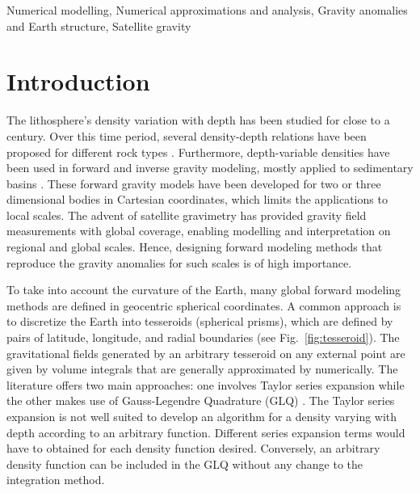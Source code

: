 \documentclass[extra]{gji}
\begin{document}
\begin{keywords}
Numerical modelling, Numerical approximations and analysis, Gravity anomalies
and Earth structure, Satellite gravity
\end{keywords}


\section{Introduction}

The lithosphere's density variation with depth has been studied for close to a
century.
Over this time period,
several density-depth relations have been proposed for different rock types
\citep[e.g.,][]{Maxant1980, Rao1986, Rao1993, Rao1994}.
Furthermore, depth-variable densities have been used in forward and
inverse gravity modeling, mostly applied to sedimentary basins
\citep{Cordell1973, Rao1986, Cowie1990, Rao1993, Rao1994, Zhang2001,
Welford2010}.
These forward gravity models have been developed for two or three dimensional
bodies in Cartesian coordinates, which limits the applications to local scales.
The advent of satellite gravimetry has provided gravity field
measurements with global coverage, enabling modelling and interpretation on regional and
global scales.
Hence, designing forward modeling methods that reproduce the gravity anomalies for
such scales is of high importance.

To take into account the curvature of the Earth, many global forward modeling methods
are defined in geocentric spherical coordinates.
A common approach is to discretize the Earth into tesseroids (spherical prisms),
which are defined by pairs of latitude, longitude, and
radial boundaries (see Fig.~\ref{fig:tesseroid}).
The gravitational fields generated by an arbitrary
tesseroid on any external point are given by volume
integrals that are generally approximated by numerically.
The literature offers two main approaches: one involves Taylor series expansion
\citep{Heck2007, Grombein2013} while the other makes use of Gauss-Legendre
Quadrature (GLQ)
\citep{Asgharzadeh2007, Wild-Pfeiffer2008, Li2011, Uieda2016}.
The Taylor series expansion is not well suited to develop an algorithm for
a density varying with depth according to an arbitrary function.
Different series expansion terms would have to obtained for each density function
desired.
Conversely, an arbitrary density function can be included in the GLQ without
any change to the integration method.
\end{document}
